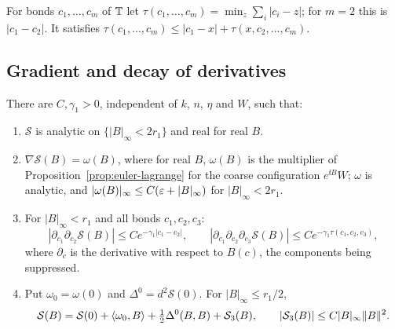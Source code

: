 For bonds $c_1,\dots,c_m$ of $\mathbb T$ let $\tau(c_1,\dots,c_m)=\min_{z}\sum_i|c_i-z|$; for $m=2$ this is $|c_1-c_2|$. It satisfies $\tau(c_1,\dots,c_m)\le|c_1-x|+\tau(x,c_2,\dots,c_m)$.

\subsection{Gradient and decay of derivatives}

\begin{proposition}\label{prop:coarse-action}
There are $C,\gamma_1>0$, independent of $k$, $n$, $\eta$ and $W$, such that:
\begin{enumerate}[label=(\alph*)]
\item $\mathcal S$ is analytic on $\{|B|_\infty<2r_1\}$ and real for real $B$.
\item $\nabla\mathcal S(B)=\omega(B)$, where for real $B$, $\omega(B)$ is the multiplier of Proposition~\ref{prop:euler-lagrange} for the coarse configuration $e^{\ii B}W$; $\omega$ is analytic, and $|\omega(B)|_\infty\le C(\varepsilon+|B|_\infty)$ for $|B|_\infty<2r_1$.
\item For $|B|_\infty<r_1$ and all bonds $c_1,c_2,c_3$:
\[
|\partial_{c_1}\partial_{c_2}\mathcal S(B)|\le Ce^{-\gamma_1|c_1-c_2|},\qquad|\partial_{c_1}\partial_{c_2}\partial_{c_3}\mathcal S(B)|\le Ce^{-\gamma_1\tau(c_1,c_2,c_3)},
\]
where $\partial_c$ is the derivative with respect to $B(c)$, the components being suppressed.
\item Put $\omega_0=\omega(0)$ and $\Delta^0=d^2\mathcal S(0)$. For $|B|_\infty\le r_1/2$,
\[
\mathcal S(B)=\mathcal S(0)+\langle \omega_0,B\rangle+\tfrac12\Delta^0(B,B)+\mathcal S_3(B),\qquad|\mathcal S_3(B)|\le C|B|_\infty\|B\|^2 .
\]
\end{enumerate}
\end{proposition}

